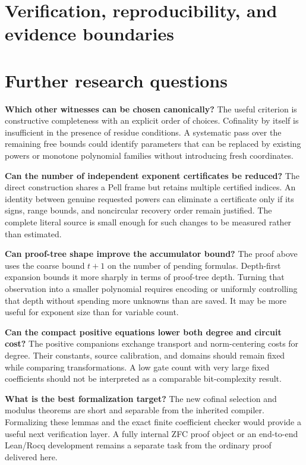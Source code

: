 \documentclass[11pt]{article}
\theoremstyle{definition}\newtheorem{definition}[theorem]{Definition}
\theoremstyle{remark}\newtheorem{remark}[theorem]{Remark}
\begin{document}



\section{Verification, reproducibility, and evidence boundaries}
\label{sec:verify}


\section{Further research questions}
\label{sec:future}

\textbf{Which other witnesses can be chosen canonically?}
The useful criterion is constructive completeness with an explicit order of
choices. Cofinality by itself is insufficient in the presence of residue
conditions. A systematic pass over the remaining free bounds could identify
parameters that can be replaced by existing powers or monotone polynomial
families without introducing fresh coordinates.

\textbf{Can the number of independent exponent certificates be reduced?}
The direct construction shares a Pell frame but retains multiple certified
indices. An identity between genuine requested powers can eliminate a
certificate only if its signs, range bounds, and noncircular recovery order
remain justified. The complete literal source is small enough for such
changes to be measured rather than estimated.

\textbf{Can proof-tree shape improve the accumulator bound?}
The proof above uses the coarse bound $t+1$ on the number of pending
formulas. Depth-first expansion bounds it more sharply in terms of proof-tree
depth. Turning that observation into a smaller polynomial requires encoding
or uniformly controlling that depth without spending more unknowns than are
saved. It may be more useful for exponent size than for variable count.

\textbf{Can the compact positive equations lower both degree and circuit cost?}
The positive companions exchange transport and norm-centering costs for
degree. Their constants, source calibration, and domains should remain fixed
while comparing transformations. A low gate count with very large fixed
coefficients should not be interpreted as a comparable bit-complexity result.

\textbf{What is the best formalization target?}
The new cofinal selection and modulus theorems are short and separable from
the inherited compiler. Formalizing these lemmas and the exact finite
coefficient checker would provide a useful next verification layer. A fully
internal ZFC proof object or an end-to-end Lean/Rocq development remains a
separate task from the ordinary proof delivered here.
\end{document}

